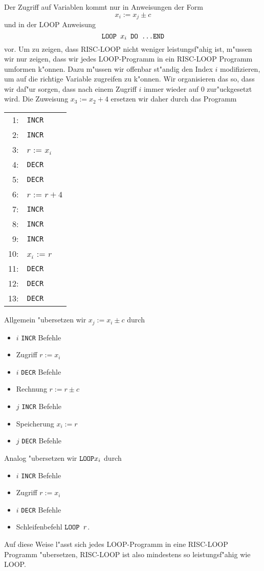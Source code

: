 \begin{loesung}
Der Zugriff auf Variablen kommt nur in Anweisungen der Form
\[
x_i:=x_j\pm c
\]
und in der LOOP Anweisung
\[
\text{\tt LOOP $x_i$ DO \dots END}
\]
vor. Um zu zeigen, dass RISC-LOOP nicht weniger leistungsf"ahig ist, m"ussen
wir nur zeigen, dass wir jedes LOOP-Programm in ein RISC-LOOP Programm
umformen k"onnen. Dazu m"ussen wir offenbar st"andig den Index $i$ modifizieren,
um auf die richtige Variable zugreifen zu k"onnen. Wir organisieren das
so, dass wir daf"ur sorgen, dass nach einem Zugriff $i$ immer wieder auf
$0$ zur"uckgesetzt wird. Die Zuweisung $x_3:=x_2+4$ ersetzen wir daher durch das Programm
\begin{center}
\begin{tabular}{r<{:}l}
1&{\tt INCR}\\
2&{\tt INCR}\\
3&$r$ := $x_i$\\
4&{\tt DECR}\\
5&{\tt DECR}\\
6&$r$ := $r + 4$\\
7&{\tt INCR}\\
8&{\tt INCR}\\
9&{\tt INCR}\\
10&$x_i$ := $r$\\
11&{\tt DECR}\\
12&{\tt DECR}\\
13&{\tt DECR}
\end{tabular}
\end{center}
Allgemein "ubersetzen wir $x_j:=x_i\pm c$ durch
\begin{itemize}
\item $i$ {\tt INCR} Befehle
\item Zugriff $r:=x_i$
\item $i$ {\tt DECR} Befehle
\item Rechnung $r:=r\pm c$
\item $j$ {\tt INCR} Befehle

\item Speicherung $x_i:=r$
\item $j$ {\tt DECR} Befehle
\end{itemize}
Analog "ubersetzen wir $\text{\tt LOOP} x_i$ durch
\begin{itemize}
\item $i$ {\tt INCR} Befehle
\item Zugriff $r:=x_i$
\item $i$ {\tt DECR} Befehle
\item Schleifenbefehl $\text{\tt LOOP }r$.
\end{itemize}
Auf diese Weise l"asst sich jedes LOOP-Programm in eine RISC-LOOP Programm
"ubersetzen, RISC-LOOP ist also mindestens so leistungsf"ahig wie LOOP.
\end{loesung}
